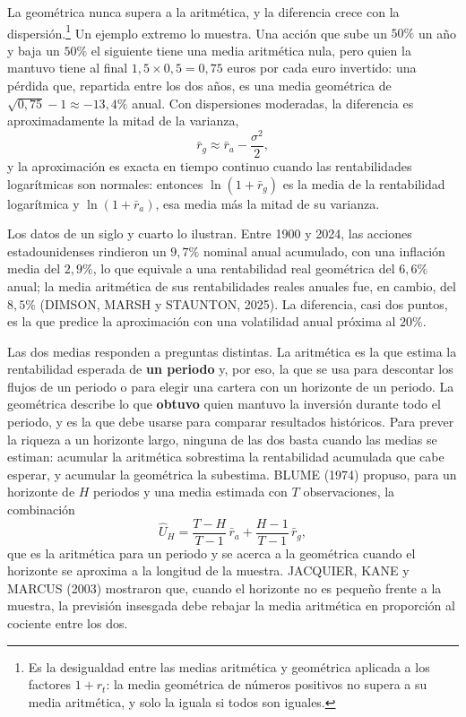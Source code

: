 \documentclass[10pt,a4paper]{article}
\begin{document}
La geométrica nunca supera a la aritmética, y la diferencia crece con la dispersión.\footnote{%
    Es la desigualdad entre las medias aritmética y geométrica aplicada a los factores $1+r_t$: la media geométrica de números positivos no supera a su media aritmética, y solo la iguala si todos son iguales.
} Un ejemplo extremo lo muestra. Una acción que sube un $50\%$ un año y baja un $50\%$ el siguiente tiene una media aritmética nula, pero quien la mantuvo tiene al final $1{,}5\times0{,}5=0{,}75$ euros por cada euro invertido: una pérdida que, repartida entre los dos años, es una media geométrica de $\sqrt{0{,}75}-1\approx-13{,}4\%$ anual. Con dispersiones moderadas, la diferencia es aproximadamente la mitad de la varianza,
$$\bar r_g\approx \bar r_a-\frac{\sigma^2}{2},$$
y la aproximación es exacta en tiempo continuo cuando las rentabilidades logarítmicas son normales: entonces $\ln(1+\bar r_g)$ es la media de la rentabilidad logarítmica y $\ln(1+\bar r_a)$, esa media más la mitad de su varianza.

Los datos de un siglo y cuarto lo ilustran. Entre 1900 y 2024, las acciones estadounidenses rindieron un $9{,}7\%$ nominal anual acumulado, con una inflación media del $2{,}9\%$, lo que equivale a una rentabilidad real geométrica del $6{,}6\%$ anual; la media aritmética de sus rentabilidades reales anuales fue, en cambio, del $8{,}5\%$ (DIMSON, MARSH y STAUNTON, 2025). La diferencia, casi dos puntos, es la que predice la aproximación con una volatilidad anual próxima al $20\%$.

Las dos medias responden a preguntas distintas. La aritmética es la que estima la rentabilidad esperada de \textbf{un periodo} y, por eso, la que se usa para descontar los flujos de un periodo o para elegir una cartera con un horizonte de un periodo. La geométrica describe lo que \textbf{obtuvo} quien mantuvo la inversión durante todo el periodo, y es la que debe usarse para comparar resultados históricos. Para prever la riqueza a un horizonte largo, ninguna de las dos basta cuando las medias se estiman: acumular la aritmética sobrestima la rentabilidad acumulada que cabe esperar, y acumular la geométrica la subestima. BLUME (1974) propuso, para un horizonte de $H$ periodos y una media estimada con $T$ observaciones, la combinación
$$\hat U_H=\frac{T-H}{T-1}\,\bar r_a+\frac{H-1}{T-1}\,\bar r_g,$$
que es la aritmética para un periodo y se acerca a la geométrica cuando el horizonte se aproxima a la longitud de la muestra. JACQUIER, KANE y MARCUS (2003) mostraron que, cuando el horizonte no es pequeño frente a la muestra, la previsión insesgada debe rebajar la media aritmética en proporción al cociente entre los dos.
\end{document}
